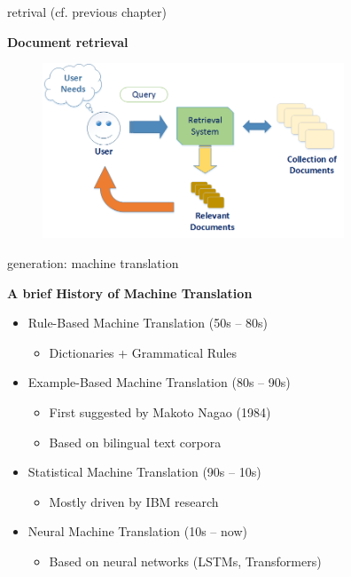 
\begin{frame}{retrival (cf. previous chapter)}
	
\vfill

\textbf{Document retrieval}

\begin{figure}
	\centering
		\includegraphics[width = 9cm]{figure/retrieval.png}\\ 
\end{figure}

\vfill

	
\end{frame}


\begin{vbframe}{generation: machine translation}

\vfill

\textbf{A brief History of Machine Translation}

\begin{itemize}
	\item Rule-Based Machine Translation (50s -- 80s)
		\begin{itemize}
			\item Dictionaries + Grammatical Rules
		\end{itemize}
	\item Example-Based Machine Translation (80s -- 90s)
		\begin{itemize}
			\item First suggested by Makoto Nagao (1984)
			\item Based on bilingual text corpora
		\end{itemize}
	\item Statistical Machine Translation (90s -- 10s)
		\begin{itemize}
			\item Mostly driven by IBM research
		\end{itemize}
	\item Neural Machine Translation (10s -- now)
		\begin{itemize}
			\item Based on neural networks (LSTMs, Transformers)
		\end{itemize}
\end{itemize}

\vfill

\end{vbframe}

